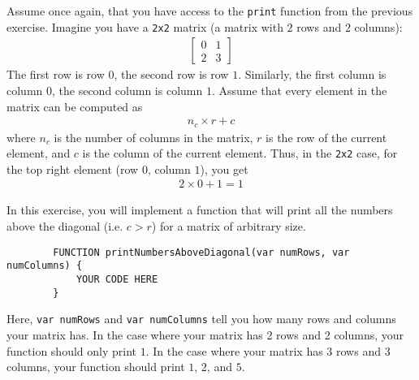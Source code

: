\documentclass{article}
\begin{document}
\begin{Exercise}
    Assume once again, that you have access to the \lstinline{print} function from the previous exercise.
    Imagine you have a \lstinline{2x2} matrix (a matrix with $2$ rows and $2$ columns): 
    \begin{align*}
        \begin{bmatrix}
            0 & 1 \\
            2 & 3
        \end{bmatrix}
    \end{align*}
    The first row is row $0$, the second row is row $1$.
    Similarly, the first column is column $0$, the second column is column $1$.
    Assume that every element in the matrix can be computed as
    \begin{align*}
        n_c \times r + c
    \end{align*}
    where $n_c$ is the number of columns in the matrix, $r$ is the row of the current element, and $c$ is the column of the current element.
    Thus, in the \lstinline{2x2} case, for the top right element (row $0$, column $1$), you get
    \begin{align*}
        2 \times 0 + 1 = 1
    \end{align*}

    In this exercise, you will implement a function that will print all the numbers above the diagonal (i.e. $c > r$) for a matrix of arbitrary size.
    \begin{lstlisting}
        FUNCTION printNumbersAboveDiagonal(var numRows, var numColumns) {
            YOUR CODE HERE
        }
    \end{lstlisting}
    Here, \lstinline{var numRows} and \lstinline{var numColumns} tell you how many rows and columns your matrix has.
    In the case where your matrix has 2 rows and 2 columns, your function should only print $1$.
    In the case where your matrix has 3 rows and 3 columns, your function should print $1$, $2$, and $5$.

\end{Exercise}
\end{document}
